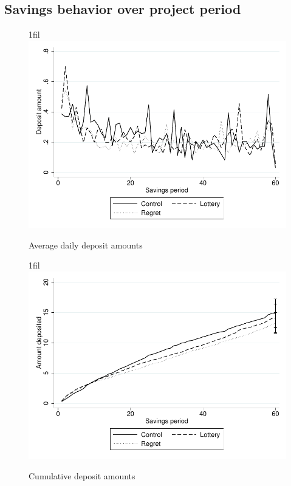 \documentclass[10pt]{article}
\makeatletter
\newcommand*{\centerfloat}{%
  \parindent \z@
  \leftskip \z@ \@plus 1fil \@minus \textwidth
  \rightskip\leftskip
  \parfillskip \z@skip}
\makeatother
\begin{document}
	\clearpage

	\subsection{Savings behavior over project period}

		\begin{figure}[!htb]
		\centering
		\caption{Average daily deposit amounts}
		\centerfloat
		\includegraphics{../../figures/line-depositamount.pdf}
		\end{figure}

		\begin{figure}[!htb]
		\centering
		\caption{Cumulative deposit amounts}
		\centerfloat
		\includegraphics{../../figures/line-cumdepositamount.pdf}
		\end{figure}
\end{document}
